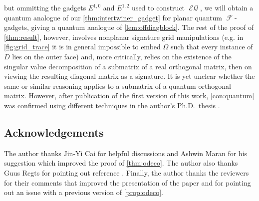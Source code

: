 \documentclass{theoretics}
\DeclareMathOperator{\fc}{\mathcal{F}}
\DeclareMathOperator{\eq}{\mathcal{EQ}}
\begin{document}
but ommitting the gadgets $E^{1,0}$ and $E^{1,2}$ used to construct $\eq$, we will obtain a quantum analogue
of our \autoref{thm:intertwiner_gadget} for planar quantum $\fc$-gadgets, giving a quantum
analogue of \autoref{lem:offdiagblock}. The rest of the proof of \autoref{thm:result}, however, involves
nonplanar signature grid manipulations (e.g. in \autoref{fig:grid_trace} it is in general impossible to embed $\Omega$ such that 
every instance of $D$ lies on the outer face) and, more critically, relies on the existence of the
singular value decomposition of a submatrix of a real orthogonal matrix, then on viewing the resulting
diagonal matrix as a signature. It is yet unclear whether the same or similar reasoning applies to a
submatrix of a quantum orthogonal matrix. However, after publication of the first version
\cite{orthogonal} of this work, \autoref{con:quantum} was confirmed using different
techniques in the author's Ph.D.~thesis \cite{young_thesis}.



\subsection*{Acknowledgements}
The author thanks Jin-Yi Cai for helpful discussions and Ashwin Maran for his suggestion which
improved the proof of \autoref{thm:odeco}. The author also thanks Guus Regts for pointing out
reference \cite{schrijver_graph_2008}. Finally, the author thanks the reviewers for their
comments that improved the presentation of the paper and for pointing out an issue
with a previous version of \autoref{prop:odeco}.

\printbibliography

\newpage
\appendix
\end{document}
